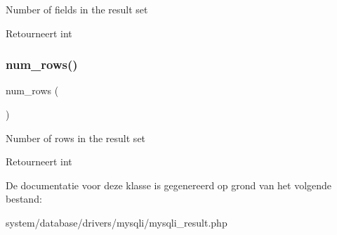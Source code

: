 Number of fields in the result set

\begin{DoxyReturn}{Retourneert}
int 
\end{DoxyReturn}
\mbox{\label{class_c_i___d_b__mysqli__result_a218657c303ee499b97710ab0cd2f5d6e}} 
\subsubsection{\texorpdfstring{num\_rows()}{num\_rows()}}
{\footnotesize\ttfamily num\+\_\+rows (\begin{DoxyParamCaption}{ }\end{DoxyParamCaption})}

Number of rows in the result set

\begin{DoxyReturn}{Retourneert}
int 
\end{DoxyReturn}


De documentatie voor deze klasse is gegenereerd op grond van het volgende bestand\+:\begin{DoxyCompactItemize}
\item 
system/database/drivers/mysqli/mysqli\+\_\+result.\+php\end{DoxyCompactItemize}
